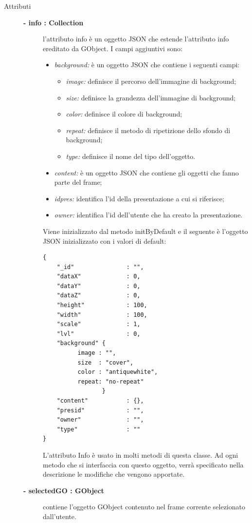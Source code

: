 \begin{description}
\item[Attributi] \hfill
	\begin{description}
		\item[\textbf{- info : Collection			}] \hfill
			l'attributo info è un oggetto JSON che estende l'attributo info ereditato da GObject. I campi aggiuntivi sono:
	\begin{itemize}
		\item \textit{background:} è un oggetto JSON che contiene i seguenti campi:
		\begin{itemize}
			\item \textit{image:} definisce il percorso dell'immagine di background;
			\item \textit{size:} definisce la grandezza dell'immagine di background;
			\item \textit{color:} definisce il colore di background;
			\item \textit{repeat:} definisce il metodo di ripetizione dello sfondo di background;
			\item \textit{type:} definisce il nome del tipo dell'oggetto.
		\end{itemize}		
		\item \textit{content:} è un oggetto JSON che contiene gli oggetti che fanno parte del frame;
		\item \textit{idpres:} identifica l'id della presentazione a cui si riferisce;
		\item \textit{owner:} identifica l'id dell'utente che ha creato la presentazione.
	\end{itemize}
	Viene inizializzato dal metodo initByDefault e il seguente è l'oggetto JSON inizializzato con i valori di default:
\begin{lstlisting}
{
    "_id"               : "",
    "dataX"             : 0,
    "dataY"             : 0,
    "dataZ"             : 0,
    "height"            : 100,
    "width"             : 100,
    "scale"             : 1,
    "lvl"               : 0,
    "background" {
          image : "",
          size  : "cover",
          color : "antiquewhite",
          repeat: "no-repeat"
                 }
    "content"           : {},
    "presid"            : "",
    "owner"             : "",
    "type"              : ""
}
\end{lstlisting}					
                 L'attributo Info è usato in molti metodi di questa classe. Ad ogni metodo che si interfaccia con questo oggetto, verrà specificato nella descrizione le modifiche che vengono apportate.
	\end{description}
	\begin{description}
		\item[\textbf{- selectedGO : GObject			}] \hfill
			contiene l'oggetto GObject contenuto nel frame corrente selezionato dall'utente.  
	\end{description}
	

\end{description}

